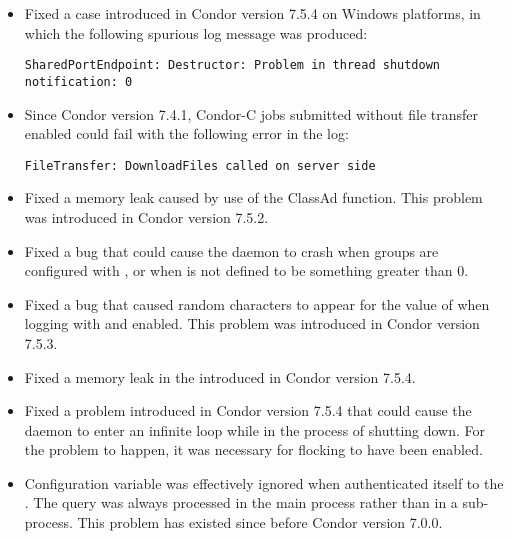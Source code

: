 \begin{itemize}
\item Fixed a case introduced in Condor version 7.5.4 on Windows platforms,
in which the following spurious log message was produced:
\begin{verbatim}
SharedPortEndpoint: Destructor: Problem in thread shutdown notification: 0
\end{verbatim}

\item Since Condor version 7.4.1,
Condor-C jobs submitted without file transfer enabled could
fail with the following error in the  log:
\begin{verbatim}
FileTransfer: DownloadFiles called on server side
\end{verbatim}

\item Fixed a memory leak caused by use of the ClassAd 
  function.  This problem was introduced in Condor version 7.5.2.

\item Fixed a bug that could cause the  daemon to
  crash when groups are configured with
  , or when
   is not defined to be something
  greater than 0.

\item Fixed a bug that caused random characters to appear for the
  value of  when logging with 
  and  enabled.
  This problem was introduced in Condor version 7.5.3.

\item Fixed a memory leak in the   
introduced in Condor version 7.5.4.

\item Fixed a problem introduced in Condor version 7.5.4 that could cause the
   daemon to enter an infinite loop while in the
  process of shutting down.  For the problem to happen, it was
  necessary for flocking to have been enabled.

\item Configuration variable  was effectively 
  ignored when  authenticated itself to the .
  The query was always
  processed in the main  process rather than in a sub-process.
  This problem has existed since before Condor version 7.0.0.


\end{itemize}
